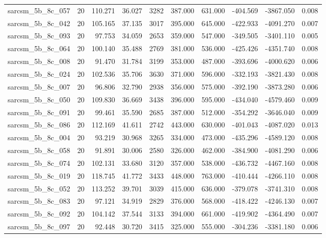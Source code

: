 \begin{tabular}{lrrrrrrrrr}
sarcsm\_5b\_8c\_057 & 20 & 110.271 & 36.027 & 3282 & 387.000 & 631.000 & -404.569 & -3867.050 & 0.008 \\
sarcsm\_5b\_8c\_042 & 20 & 105.165 & 37.135 & 3017 & 395.000 & 645.000 & -422.933 & -4091.270 & 0.007 \\
sarcsm\_5b\_8c\_093 & 20 & 97.753 & 34.059 & 2653 & 359.000 & 547.000 & -349.505 & -3401.110 & 0.005 \\
sarcsm\_5b\_8c\_064 & 20 & 100.140 & 35.488 & 2769 & 381.000 & 536.000 & -425.426 & -4351.740 & 0.008 \\
sarcsm\_5b\_8c\_008 & 20 & 91.470 & 31.784 & 3199 & 353.000 & 487.000 & -393.696 & -4000.620 & 0.006 \\
sarcsm\_5b\_8c\_024 & 20 & 102.536 & 35.706 & 3630 & 371.000 & 596.000 & -332.193 & -3821.430 & 0.008 \\
sarcsm\_5b\_8c\_007 & 20 & 96.806 & 32.790 & 2938 & 356.000 & 575.000 & -392.190 & -3873.280 & 0.006 \\
sarcsm\_5b\_8c\_050 & 20 & 109.830 & 36.669 & 3438 & 396.000 & 595.000 & -434.040 & -4579.460 & 0.009 \\
sarcsm\_5b\_8c\_091 & 20 & 99.461 & 35.590 & 2685 & 387.000 & 512.000 & -354.292 & -3646.040 & 0.009 \\
sarcsm\_5b\_8c\_086 & 20 & 112.169 & 41.611 & 2742 & 443.000 & 630.000 & -401.043 & -4087.020 & 0.013 \\
sarcsm\_5b\_8c\_004 & 20 & 93.219 & 30.968 & 3265 & 334.000 & 473.000 & -435.296 & -4589.120 & 0.008 \\
sarcsm\_5b\_8c\_058 & 20 & 91.891 & 30.006 & 2580 & 326.000 & 462.000 & -384.900 & -4081.290 & 0.006 \\
sarcsm\_5b\_8c\_074 & 20 & 102.131 & 33.680 & 3120 & 357.000 & 538.000 & -436.732 & -4467.160 & 0.008 \\
sarcsm\_5b\_8c\_019 & 20 & 118.745 & 41.772 & 3433 & 448.000 & 763.000 & -410.444 & -4266.110 & 0.008 \\
sarcsm\_5b\_8c\_052 & 20 & 113.252 & 39.701 & 3039 & 415.000 & 636.000 & -379.078 & -3741.310 & 0.008 \\
sarcsm\_5b\_8c\_083 & 20 & 97.121 & 34.919 & 2829 & 376.000 & 568.000 & -418.422 & -4246.130 & 0.007 \\
sarcsm\_5b\_8c\_092 & 20 & 104.142 & 37.544 & 3133 & 394.000 & 661.000 & -419.902 & -4364.490 & 0.007 \\
sarcsm\_5b\_8c\_097 & 20 & 92.448 & 30.720 & 3415 & 325.000 & 555.000 & -304.236 & -3381.180 & 0.006 \\

\end{tabular}
